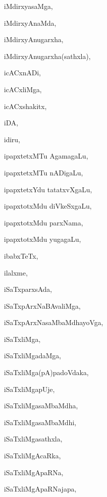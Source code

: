 \begin{multicols}{2}
{iMdirxyasaMga}, \pageref{iMdirxyasaMga}

{iMdirxyAnaMda}, \pageref{iMdirxyAnaMda}

{iMdirxyAnugarxha}, \pageref{iMdirxyAnugarxha}

{iMdirxyAnugarxha(sathxla)}, \pageref{iMdirxyAnugarxha(sathxla)}

{icACxnADi}, \pageref{icACxnADi}

{icACxliMga}, \pageref{icACxliMga}

{icACxshakitx}, \pageref{icACxshakitx}

{iDA}, \pageref{iDA}

{idiru}, \pageref{idiru}

{ipapxtetxMTu AgamagaLu}, \pageref{ipapxtetxMTu AgamagaLu}

{ipapxtetxMTu nADigaLu}, \pageref{ipapxtetxMTu nADigaLu}

{ipapxtetxYdu tatatxvXgaLu}, \pageref{ipapxtetxYdu tatatxvXgaLu}

{ipapxtotxMdu diVkeSxgaLu}, \pageref{ipapxtotxMdu diVkeSxgaLu}

{ipapxtotxMdu parxNama}, \pageref{ipapxtotxMdu parxNama}

{ipapxtotxMdu yugagaLu}, \pageref{ipapxtotxMdu yugagaLu}

{ibabxTeTx}, \pageref{ibabxTeTx}

{ilalxme}, \pageref{ilalxme}

{iSaTxparxsAda}, \pageref{iSaTxparxsAda}

{iSaTxpArxNaBAvaliMga}, \pageref{iSaTxpArxNaBAvaliMga}

{iSaTxpArxNasaMbaMdhayoVga}, \pageref{iSaTxpArxNasaMbaMdhayoVga}

{iSaTxliMga}, \pageref{iSaTxliMga}

{iSaTxliMgadaMga}, \pageref{iSaTxliMgadaMga}

{iSaTxliMga(pA)padoVdaka}, \pageref{iSaTxliMga(pA)padoVdaka}

{iSaTxliMgapUje}, \pageref{iSaTxliMgapUje}

{iSaTxliMgasaMbaMdha}, \pageref{iSaTxliMgasaMbaMdha}

{iSaTxliMgasaMbaMdhi}, \pageref{iSaTxliMgasaMbaMdhi}

{iSaTxliMgasathxla}, \pageref{iSaTxliMgasathxla}

{iSaTxliMgAcaRka}, \pageref{iSaTxliMgAcaRka}

{iSaTxliMgApaRNa}, \pageref{iSaTxliMgApaRNa}

{iSaTxliMgApaRNajapa}, \pageref{iSaTxliMgApaRNajapa}


\end{multicols}
